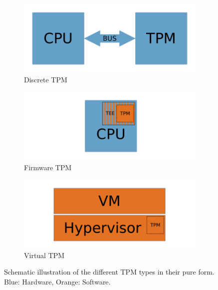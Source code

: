 \begin{figure}
    \centering
    \begin{subfigure}{0.49\textwidth}
      \includegraphics[width=\linewidth]{figures/dTPM.pdf}
      \caption{Discrete TPM} \label{fig:dtpm}
    \end{subfigure}%
    \hspace*{\fill}   %
    \begin{subfigure}{0.49\textwidth}
      \includegraphics[width=\linewidth]{figures/fTPM.pdf}
      \caption{Firmware TPM} \label{fig:ftpm}
    \end{subfigure}%

    \begin{subfigure}{0.49\textwidth}
      \includegraphics[width=\linewidth]{figures/vTPM.pdf}
      \caption{Virtual TPM} \label{fig:vtpm}
    \end{subfigure}%
  
  \caption{Schematic illustration of the different TPM types in their pure form. Blue: Hardware, Orange: Software.} \label{fig:tpm_types}
  \end{figure}

